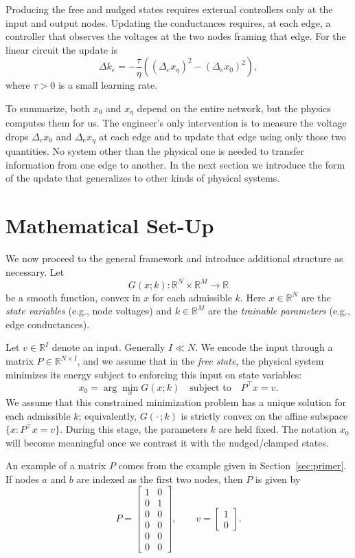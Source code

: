 \documentclass{siamart}
\begin{document}
Producing the free and nudged states requires external controllers only at the input and output nodes. Updating the conductances requires, at each edge, a controller that observes the voltages at the two nodes framing that edge. For the linear circuit the update is
\[\Delta k_e = -\dfrac{\tau}{\eta}\left(\left(\Delta_e x_\eta\right)^2 - \left(\Delta_e x_0\right)^2 \right),\]
where $\tau > 0$ is a small learning rate.

To summarize, both $x_0$ and $x_\eta$ depend on the entire network, but the physics computes them for us. The engineer's only intervention is to measure the voltage drops $\Delta_e x_0$ and $\Delta_e x_\eta$ at each edge and to update that edge using only those two quantities. No system other than the physical one is needed to transfer information from one edge to another. In the next section we introduce the form of the update that generalizes to other kinds of physical systems.


\section{Mathematical Set-Up}
\label{Mathematical Set up}

We now proceed to the general framework and introduce additional structure as necessary.
Let
\[
    G(x;k): \mathbb{R}^{N} \times \mathbb{R}^{M} \to \mathbb{R}
\]
be a smooth function, convex in $x$ for each admissible $k$. Here $x \in \mathbb{R}^N$ are the \textit{state variables} (e.g., node voltages) and $k \in \mathbb{R}^M$ are the \textit{trainable parameters} (e.g., edge conductances).

Let $v \in \mathbb{R}^I$ denote an input. Generally $I\ll N.$ We encode the input through a matrix $P \in \mathbb{R}^{N \times I}$, and we assume that in the \emph{free state}, the physical system minimizes its energy subject to enforcing this input on state variables:
\begin{equation}
    x_0 
    = \arg\min_{x} G(x;k)
    \quad\text{subject to} \quad 
    P^\top x = v.
    \label{eq:free-state}
\end{equation}
We assume that this constrained minimization problem has a unique solution for each admissible $k$; equivalently, $G(\cdot\,;k)$ is strictly convex on the affine subspace $\{x : P^\top x = v\}$. During this stage, the parameters $k$ are held fixed.
The notation $x_0$ will become meaningful once we contrast it with the nudged/clamped states.

An example of a matrix $P$ comes from the example given in Section~\ref{sec:primer}. If nodes $a$ and $b$ are indexed as the first two nodes, then $P$ is given by 
\[P = \begin{bmatrix}
    1 & 0 \\
    0 & 1 \\ 
    0 & 0 \\
    0 & 0 \\
    0 & 0 \\
    0 & 0
\end{bmatrix}, \qquad v = \begin{bmatrix}
    1 \\0
\end{bmatrix}.\]
\end{document}
